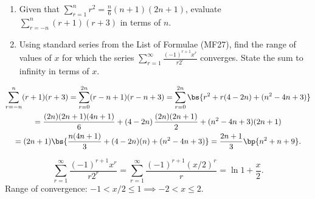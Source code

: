 \begin{problem}
    \begin{enumerate}
        \item Given that $\sum_{r=1}^n r^2 = \frac{n}6 (n+1)(2n+1)$, evaluate $\sum_{r=-n}^n (r+1)(r+3)$ in terms of $n$.
        \item Using standard series from the List of Formulae (MF27), find the range of values of $x$ for which the series $\sum_{r=1}^\infty \frac{(-1)^{r+1} x^r}{r 2^r}$ converges. State the sum to infinity in terms of $x$.
    \end{enumerate}
\end{problem}
\begin{solution}
    \begin{ppart}
        \begin{gather*}
            \sum_{r=-n}^n (r+1)(r+3) = \sum_{r=0}^{2n} (r-n+1)(r-n+3) = \sum_{r=0}^{2n} \bs{r^2 + r(4-2n) + (n^2 - 4n + 3)}\\
            = \frac{(2n)(2n+1)(4n+1)}{6} + (4-2n) \, \frac{(2n)(2n+1)}2 + (n^2 - 4n + 3) (2n+1)\\
            = (2n+1)\bs{\frac{n(4n+1)}{3} + (4-2n)(n) + (n^2 - 4n + 3)} = \frac{2n+1}{3} \bp{n^2 + n +9}.
        \end{gather*}
    \end{ppart}
    \begin{ppart}
        \[\sum_{r=1}^\infty \frac{(-1)^{r+1} x^r}{r 2^r} = \sum_{r=1}^\infty \frac{(-1)^{r+1} (x/2)^r}{r} = \boxed{\ln{1 + \frac{x}2}}.\] Range of convergence: $-1 < x/2 \leq 1 \implies -2 < x \leq 2$.
    \end{ppart}
\end{solution}


